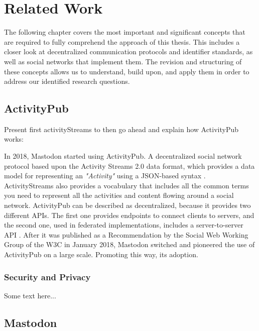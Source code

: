 \chapter{Related Work}
\label{cha:relatedwork}


The following chapter covers the most important and significant concepts that are required to fully comprehend the approach of this thesis. This includes a closer look at decentralized  communication protocols and identifier standards, as well as social networks that implement them. The revision and structuring of these concepts allows us to understand, build upon, and apply them in order to address our identified research questions. 

\section{ActivityPub}

Present first activityStreams to then go ahead and explain how ActivityPub works:

In 2018, Mastodon started using ActivityPub. A decentralized social network protocol based upon the Activity Streams 2.0 data format, which provides a data model for representing an \emph{"Activity"} using a JSON-based syntax \cite{snell_prodromou_2017}. ActivityStreams also provides a vocabulary that includes all the common terms you need to represent all the activities and content flowing around a social network. ActivityPub can be described as decentralized, because it provides two different APIs. The first one provides endpoints to connect clients to servers, and the second one, used in federated implementations, includes a server-to-server API \cite{lemmer-webber_tallon_guy_prodromou_2018}. After it was published as a Recommendation by the Social Web Working Group of the W3C in January 2018, Mastodon switched and pioneered the use of ActivityPub on a large scale. Promoting this way, its adoption.

\subsection{Security and Privacy}
Some text here...

\section{Mastodon}


